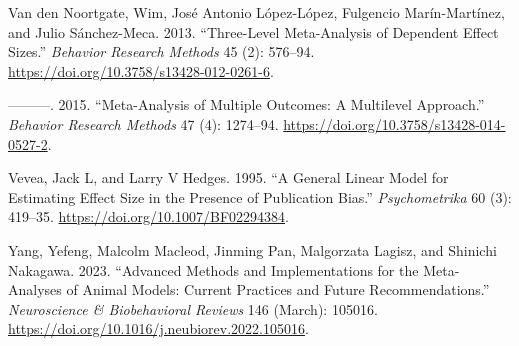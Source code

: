 \documentclass[
]{article}
\newlength{\cslhangindent}
\newenvironment{CSLReferences}[2] %
 {\begin{list}{}{%
  \setlength{\itemindent}{0pt}
  \setlength{\leftmargin}{0pt}
  \setlength{\parsep}{0pt}
  \ifodd #1
   \setlength{\leftmargin}{\cslhangindent}
   \setlength{\itemindent}{-1\cslhangindent}
  \fi
  \setlength{\itemsep}{#2\baselineskip}}}
 {\end{list}}
\begin{document}
\begin{CSLReferences}{1}{0}
Van den Noortgate, Wim, José Antonio López-López, Fulgencio
Marín-Martínez, and Julio Sánchez-Meca. 2013. {``Three-Level
Meta-Analysis of Dependent Effect Sizes.''} \emph{Behavior Research
Methods} 45 (2): 576--94.
\url{https://doi.org/10.3758/s13428-012-0261-6}.

---------. 2015. {``Meta-Analysis of Multiple Outcomes: A Multilevel
Approach.''} \emph{Behavior Research Methods} 47 (4): 1274--94.
\url{https://doi.org/10.3758/s13428-014-0527-2}.

Vevea, Jack L, and Larry V Hedges. 1995. {``A General Linear Model for
Estimating Effect Size in the Presence of Publication Bias.''}
\emph{Psychometrika} 60 (3): 419--35.
\url{https://doi.org/10.1007/BF02294384}.

Yang, Yefeng, Malcolm Macleod, Jinming Pan, Malgorzata Lagisz, and
Shinichi Nakagawa. 2023. {``Advanced Methods and Implementations for the
Meta-Analyses of Animal Models: {Current} Practices and Future
Recommendations.''} \emph{Neuroscience \& Biobehavioral Reviews} 146
(March): 105016. \url{https://doi.org/10.1016/j.neubiorev.2022.105016}.

\end{CSLReferences}
\end{document}
